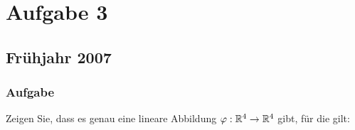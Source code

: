 \chapter{Aufgabe 3}

\section{Frühjahr 2007}

\subsection{Aufgabe}
Zeigen Sie, dass es genau eine lineare Abbildung \( \varphi: \mathbb{R}^4 \to \mathbb{R}^4 \) gibt, für die gilt:
